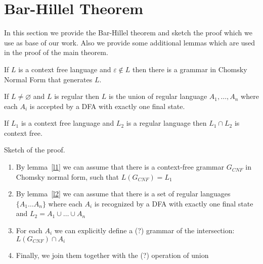 \section{Bar-Hillel Theorem}

In this section we provide the Bar-Hillel theorem and sketch the proof which we use as base of our work.
Also we provide some additional lemmas which are used in the proof of the main theorem.

\begin{lemma} \label{l1}
	If $L$ is a context free language and $\varepsilon \notin L$ then there is a grammar in Chomsky Normal Form that generates $L$.
\end{lemma}

\begin{lemma} \label{l2}
	If $ L \neq \varnothing $ and $L$ is regular then $L$ is the union of regular language $A_1, \ldots , A_n$ where each $A_i$ is accepted by a DFA with exactly one final state.
\end{lemma}

\begin{theorem}
	If $L_1$ is a context free language and $L_2$ is a regular language then $L_1 \cap L_2$ is context free.
\end{theorem}


Sketch of the proof.
\begin{enumerate}
	\item By lemma~\ref{l1} we can assume that there is a context-free grammar $G_{CNF}$ in Chomsky normal form, such that $L(G_{CNF}) = L_1$
	\item By lemma~\ref{l2} we can assume that there is a set of regular languages $\{A_{1} \ldots A_n \}$ where each $A_i$ is recognized by a DFA with exactly one final state and $L_2 = A_1 \cup \ldots \cup A_n$
	\item For each $A_i$ we can explicitly define a (?) grammar of the intersection: $L( G_{CNF} ) \cap A_i$
	\item Finally, we join them together with the (?) operation of union
\end{enumerate}
